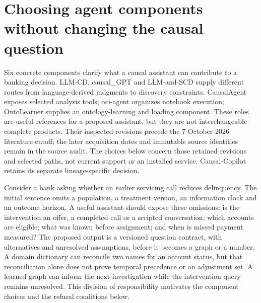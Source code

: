 \section{Choosing agent components without changing the causal question}
\label{sec:exec25-agents-reuse}
Six concrete components clarify what a causal assistant can contribute to a
banking decision. LLM-CD, causal\_GPT and LLM-and-SCD supply different routes
from language-derived judgments to discovery constraints. CausalAgent exposes
selected analysis tools; oci-agent organizes notebook execution; OntoLearner
supplies an ontology-learning and loading component. These roles are useful
references for a proposed assistant, but they are not interchangeable complete
products. Their inspected revisions precede the 7 October 2026 literature cutoff;
the later acquisition dates and immutable source identities remain in the
source audit. The choices below concern those retained revisions and selected
paths, not current support or an installed service. Causal-Copilot retains its
separate lineage-specific decision.~\citep{exec14_iid_cd,exec14_iid_gpt,exec14_iid_scd,exec13_data_causalagent_code,exec13_data_oci_code,exec13_data_ontolearner_code}

Consider a bank asking whether an earlier servicing call reduces delinquency.
The initial sentence omits a population, a treatment version, an information
clock and an outcome horizon. A useful assistant should expose these omissions:
is the intervention an offer, a completed call or a scripted conversation;
which accounts are eligible; what was known before assignment; and when is
missed payment measured? The proposed output is a versioned question contract,
with alternatives and unresolved assumptions, before it becomes a graph or a
number. A domain dictionary can reconcile two names for an account status, but
that reconciliation alone does not prove temporal precedence or an adjustment
set. A learned graph can inform the next investigation while the intervention
query remains unresolved. This division of responsibility motivates the
component choices and the refusal conditions below.~\citep{exec25_agents_choice}

